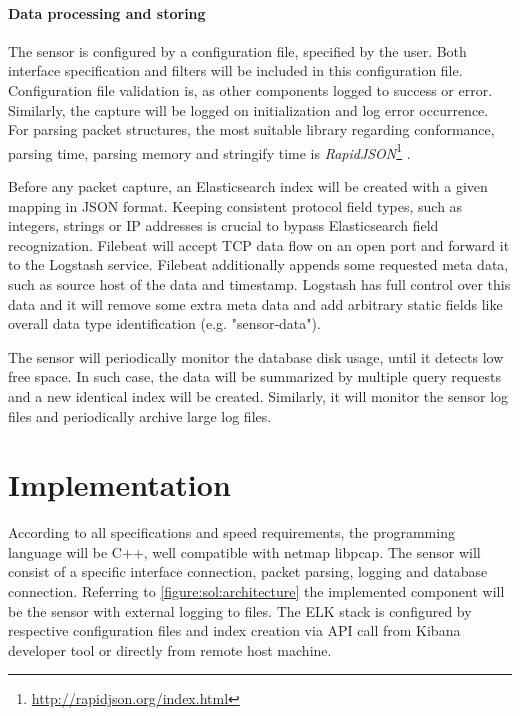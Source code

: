 \documentclass[12pt,a4paper,twoside]{report}
\begin{document}
			\subsubsection*{Data processing and storing} \label{solution:design:process}
				The sensor is configured by a configuration file, specified by the user. Both interface specification and filters will be included in this configuration file. Configuration file validation is, as other components logged to  success or error. Similarly, the capture will be logged on initialization and log error occurrence. For parsing packet structures, the most suitable library regarding conformance, parsing time, parsing memory and stringify time is \emph{RapidJSON}\footnote{\url{http://rapidjson.org/index.html}} \cite{git:benchmark:json}.\par
				Before any packet capture, an Elasticsearch index will be created with a given mapping in JSON format. Keeping consistent protocol field types, such as integers, strings or IP addresses is crucial to bypass Elasticsearch field recognization. Filebeat will accept TCP data flow on an open port and forward it to the Logstash service. Filebeat additionally appends some requested meta data, such as source host of the data and timestamp. Logstash has full control over this data and it will remove some extra meta data and add arbitrary static fields like overall data type identification (e.g. "sensor-data").\par
				The sensor will periodically monitor the database disk usage, until it detects low free space. In such case, the data will be summarized by multiple query requests and a new identical index will be created. Similarly, it will monitor the sensor log files and periodically archive large log files.
\chapter{Implementation} \label{solution:implementation}
	According to all specifications and speed requirements, the programming language will be C++, well compatible with netmap libpcap. The sensor will consist of a specific interface connection, packet parsing, logging and database connection. Referring to \autoref{figure:sol:architecture} the implemented component will be the sensor with external logging to files. The ELK stack is configured by respective configuration files and index creation via API call from Kibana developer tool or directly from remote host machine.
\end{document}
